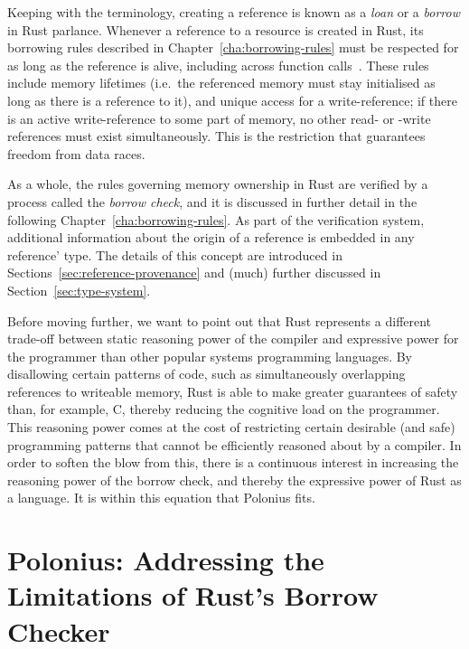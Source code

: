 \documentclass[11pt,a4paper,twoside,openany]{report}
\renewcommand\_{\textunderscore\allowbreak}
\begin{document}
Keeping with the terminology, creating a reference is known as a \textit{loan}
or a \textit{borrow} in Rust parlance. Whenever a reference to a resource is
created in Rust, its borrowing rules described in
Chapter~\ref{cha:borrowing-rules} must be respected for as long as the reference
is alive, including across function calls~\cite{nichols_rust_nodate}. These
rules include memory lifetimes (i.e.\ the referenced memory must stay initialised
as long as there is a reference to it), and unique access for a write-reference;
if there is an active write-reference to some part of memory, no other read- or
-write references must exist simultaneously. This is the restriction that
guarantees freedom from data races.

As a whole, the rules governing memory ownership in Rust are verified by a
process called the \textit{borrow check}, and it is discussed in further detail
in the following Chapter~\ref{cha:borrowing-rules}. As part of the verification
system, additional information about the origin of a reference is embedded in
any reference' type. The details of this concept are introduced in
Sections~\ref{sec:reference-provenance} and (much) further discussed in
Section~\ref{sec:type-system}.

Before moving further, we want to point out that Rust represents a different
trade-off between static reasoning power of the compiler and expressive power
for the programmer than other popular systems programming languages. By
disallowing certain patterns of code, such as simultaneously overlapping
references to writeable memory, Rust is able to make greater guarantees of
safety than, for example, C, thereby reducing the cognitive load on the
programmer. This reasoning power comes at the cost of restricting certain
desirable (and safe) programming patterns that cannot be efficiently reasoned
about by a compiler. In order to soften the blow from this, there is a
continuous interest in increasing the reasoning power of the borrow check, and
thereby the expressive power of Rust as a language. It is within this equation
that Polonius fits.

\section{Polonius: Addressing the Limitations of Rust's Borrow
  Checker}\label{sec:limitations}
\end{document}
